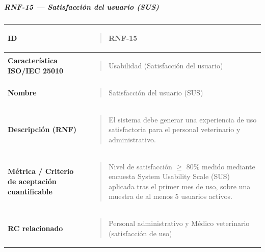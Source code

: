 \documentclass[
]{article}
\newcounter{none} %
\begin{document}
\subparagraph{RNF-15 --- Satisfacción del usuario
(SUS)}\label{rnf-15-satisfaccion-del-usuario-sus}

{\def\LTcaptype{none} %
\begin{longtable}[]{@{}
  >{\raggedright\arraybackslash}p{}
  >{\raggedright\arraybackslash}p{}@{}}
\toprule\noalign{}
\begin{minipage}[b]{\linewidth}\raggedright
\textbf{ID}
\end{minipage} & \begin{minipage}[b]{\linewidth}\raggedright
\begin{quote}
RNF-15
\end{quote}
\end{minipage} \\
\midrule\noalign{}
\endhead
\bottomrule\noalign{}
\endlastfoot
\textbf{Característica ISO/IEC 25010} & \begin{minipage}[t]{\linewidth}\raggedright
\begin{quote}
Usabilidad (Satisfacción del usuario)
\end{quote}
\end{minipage} \\
\textbf{Nombre} & \begin{minipage}[t]{\linewidth}\raggedright
\begin{quote}
Satisfacción del usuario (SUS)
\end{quote}
\end{minipage} \\
\textbf{Descripción (RNF)} & \begin{minipage}[t]{\linewidth}\raggedright
\begin{quote}
El sistema debe generar una experiencia de uso satisfactoria para el
personal veterinario y administrativo.
\end{quote}
\end{minipage} \\
\textbf{Métrica / Criterio de aceptación cuantificable} & \begin{minipage}[t]{\linewidth}\raggedright
\begin{quote}
Nivel de satisfacción \(\geq\) 80\% medido mediante encuesta System
Usability Scale (SUS) aplicada tras el primer mes de uso, sobre una
muestra de al menos 5 usuarios activos.
\end{quote}
\end{minipage} \\
\textbf{RC relacionado} & \begin{minipage}[t]{\linewidth}\raggedright
\begin{quote}
Personal administrativo y Médico veterinario (satisfacción de uso)
\end{quote}
\end{minipage} \\
\end{longtable}
}
\end{document}
